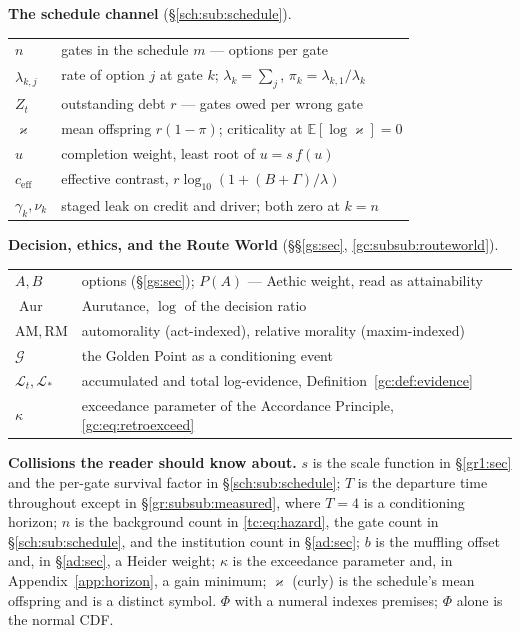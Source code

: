 \documentclass[11pt]{article}
\numberwithin{equation}{section}
\theoremstyle{plain}
\theoremstyle{definition}
\theoremstyle{remark}
\newcommand{\E}{\mathbb{E}}
\newcommand{\Lc}{\mathcal{L}}
\begin{document}
\smallskip
\noindent\textbf{The schedule channel} (\S\ref{sch:sub:schedule}).
\begin{center}\small
\begin{tabular}{@{}ll@{}}
\toprule
$n$ & gates in the schedule \qquad $m$ --- options per gate\\
$\lambda_{k,j}$ & rate of option $j$ at gate $k$; $\lambda_k=\sum_j$,
$\pi_k=\lambda_{k,1}/\lambda_k$\\
$Z_t$ & outstanding debt \qquad $r$ --- gates owed per wrong gate\\
$\varkappa$ & mean offspring $r(1-\pi)$; criticality at
$\E[\log\varkappa]=0$\\
$u$ & completion weight, least root of $u=s\,f(u)$\\
$c_{\mathrm{eff}}$ & effective contrast, $r\log_{10}(1+(B+\Gamma)/\lambda)$\\
$\gamma_k,\nu_k$ & staged leak on credit and driver; both zero at $k=n$\\
\bottomrule
\end{tabular}
\end{center}

\smallskip
\noindent\textbf{Decision, ethics, and the Route World}
(\S\S\ref{gs:sec}, \ref{gc:subsub:routeworld}).
\begin{center}\small
\begin{tabular}{@{}ll@{}}
\toprule
$A,B$ & options (\S\ref{gs:sec}); $P(A)$ --- Aethic weight, read as
attainability\\
$\operatorname{Aur}$ & Aurutance, $\log$ of the decision ratio\\
$\mathrm{AM},\mathrm{RM}$ & automorality (act-indexed), relative morality
(maxim-indexed)\\
$\mathcal G$ & the Golden Point as a conditioning event\\
$\Lc_t,\Lc_\ast$ & accumulated and total log-evidence,
Definition~\ref{gc:def:evidence}\\
$\kappa$ & exceedance parameter of the Accordance Principle,
\eqref{gc:eq:retroexceed}\\
\bottomrule
\end{tabular}
\end{center}

\smallskip
\noindent\textbf{Collisions the reader should know about.} $s$ is the
scale function in \S\ref{gr1:sec} and the per-gate survival factor in
\S\ref{sch:sub:schedule}; $T$ is the departure time throughout except in
\S\ref{gr:subsub:measured}, where $T=4$ is a conditioning horizon; $n$ is
the background count in \eqref{tc:eq:hazard}, the gate count in
\S\ref{sch:sub:schedule}, and the institution count in \S\ref{ad:sec};
$b$ is the muffling offset and, in \S\ref{ad:sec}, a Heider weight;
$\kappa$ is the exceedance parameter and, in Appendix~\ref{app:horizon},
a gain minimum; $\varkappa$ (curly) is the schedule's mean offspring and
is a distinct symbol. $\Phi$ with a numeral indexes premises; $\Phi$
alone is the normal CDF.
\end{document}
